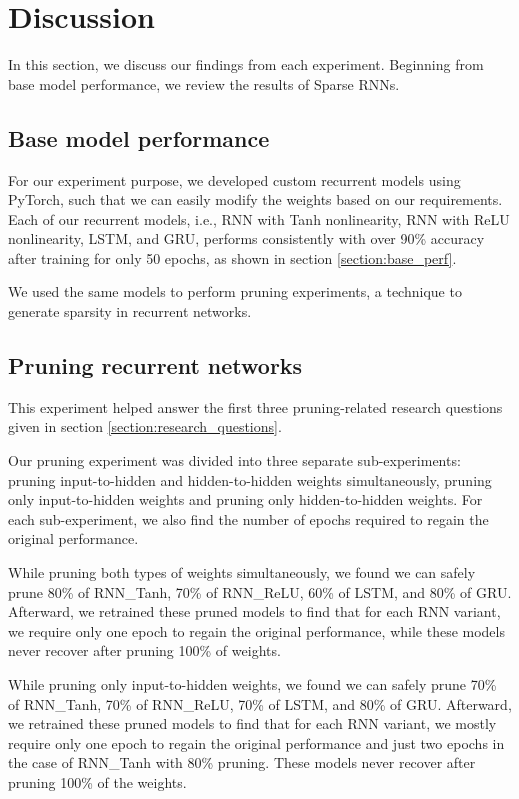 \chapter{Discussion}\label{chap:discussion}

In this section, we discuss our findings from each experiment. Beginning from base model performance, we review the results of Sparse RNNs.

\section{Base model performance}

For our experiment purpose, we developed custom recurrent models using PyTorch, such that we can easily modify the weights based on our requirements. Each of our recurrent models, i.e., RNN with Tanh nonlinearity, RNN with ReLU nonlinearity, LSTM, and GRU, performs consistently with over 90\% accuracy after training for only 50 epochs, as shown in section \ref{section:base_perf}.

We used the same models to perform pruning experiments, a technique to generate sparsity in recurrent networks.

\section{Pruning recurrent networks}

This experiment helped answer the first three pruning-related research questions given in section \ref{section:research_questions}. 

Our pruning experiment was divided into three separate sub-experiments: pruning input-to-hidden and hidden-to-hidden weights simultaneously, pruning only input-to-hidden weights and pruning only hidden-to-hidden weights. For each sub-experiment, we also find the number of epochs required to regain the original performance.

While pruning both types of weights simultaneously, we found we can safely prune 80\% of RNN\_Tanh, 70\% of RNN\_ReLU, 60\% of LSTM, and 80\% of GRU. Afterward, we retrained these pruned models to find that for each RNN variant, we require only one epoch to regain the original performance, while these models never recover after pruning 100\% of weights.

While pruning only input-to-hidden weights, we found we can safely prune 70\% of RNN\_Tanh, 70\% of RNN\_ReLU, 70\% of LSTM, and 80\% of GRU. Afterward, we retrained these pruned models to find that for each RNN variant, we mostly require only one epoch to regain the original performance and just two epochs in the case of RNN\_Tanh with 80\% pruning. These models never recover after pruning 100\% of the weights.

